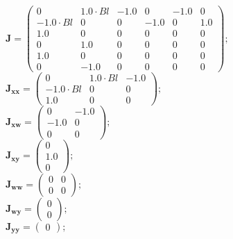 \documentclass[11pt, oneside]{article}      %
\begin{document}
%
$ \mathbf{J} = \left(\begin{array}{cccccc}0 & 1.0 \cdot Bl & -1.0 & 0 & -1.0 & 0\\- 1.0 \cdot Bl & 0 & 0 & -1.0 & 0 & 1.0\\1.0 & 0 & 0 & 0 & 0 & 0\\0 & 1.0 & 0 & 0 & 0 & 0\\1.0 & 0 & 0 & 0 & 0 & 0\\0 & -1.0 & 0 & 0 & 0 & 0\end{array}\right) ; $ 
%
\\
%
$ \mathbf{J_{xx}} = \left(\begin{array}{ccc}0 & 1.0 \cdot Bl & -1.0\\- 1.0 \cdot Bl & 0 & 0\\1.0 & 0 & 0\end{array}\right) ; $ 
%
\\
%
$ \mathbf{J_{xw}} = \left(\begin{array}{cc}0 & -1.0\\-1.0 & 0\\0 & 0\end{array}\right) ; $ 
%
\\
%
$ \mathbf{J_{xy}} = \left(\begin{array}{c}0\\1.0\\0\end{array}\right) ; $ 
%
\\
%
$ \mathbf{J_{ww}} = \left(\begin{array}{cc}0 & 0\\0 & 0\end{array}\right) ; $ 
%
\\
%
$ \mathbf{J_{wy}} = \left(\begin{array}{c}0\\0\end{array}\right) ; $ 
%
\\
%
$ \mathbf{J_{yy}} = \left(\begin{array}{c}0\end{array}\right) ; $ 
%
\\
%
\end{document}
